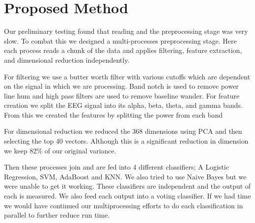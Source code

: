 \section{Proposed Method}
\label{sec:proposed_method}

Our preliminary testing found that reading and the preprocessing stage
was very slow.
To combat this we designed a multi-processes preprocessing stage.
Here each process reads a chunk of the data and applies filtering,
feature extraction, and dimensional reduction independently.

For filtering we use a butter worth filter with various cutoffs which are dependent on the signal in which we are processing.
Band notch is used to remove power line hum and high pass filters are used to remove
baseline wander.
For feature creation we split the EEG signal into its alpha, beta, theta, and gamma bands.
From this we created the features by splitting the power from each band

For dimensional reduction we reduced the 368 dimensions using PCA
and then selecting the top 40 vectors.
Although this is a significant reduction in dimension we keep 82\% of our
original variance.

Then these processes join and are fed into 4 different classifiers;
A Logistic Regression, SVM, AdaBoost and KNN.
We also tried to use Naive Bayes but we were unable to get it working.
These classifiers are independent and the output of each is measured.
We also feed each output into a voting classifier.
If we had time we would have continued our multiprocessing efforts to do each
classification in parallel to further reduce run time.
